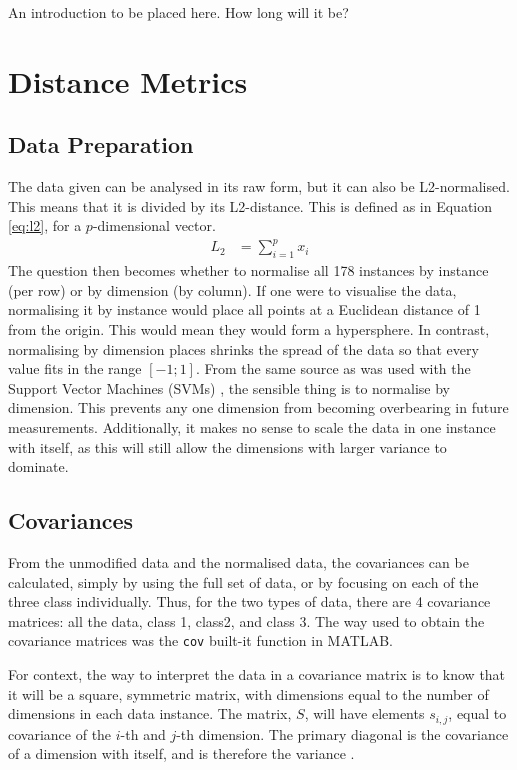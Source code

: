 \documentclass[a4paper, 10pt, conference]{ieeeconf}
\begin{document}
An introduction to be placed here. How long will it be?

\section{Distance Metrics}
\subsection{Data Preparation}
The data given can be analysed in its raw form, but it can also be L2-normalised. This means that it is divided by its L2-distance. This is defined as in Equation \ref{eq:l2}, for a $p$-dimensional vector.
\begin{align}
  L_2 &= \sum_{i = 1}^{p} x_i \label{eq:l2}
\end{align}
The question then becomes whether to normalise all 178 instances by instance (per row) or by dimension (by column). If one were to visualise the data, normalising it by instance would place all points at a Euclidean distance of 1 from the origin. This would mean they would form a hypersphere. In contrast, normalising by dimension places shrinks the spread of the data so that every value fits in the range $[-1; 1]$. From the same source as was used with the Support Vector Machines (SVMs) \cite{scale}, the sensible thing is to normalise by dimension. This prevents any one dimension from becoming overbearing in future measurements. Additionally, it makes no sense to scale the data in one instance with itself, as this will still allow the dimensions with larger variance to dominate.

\subsection{Covariances}
From the unmodified data and the normalised data, the covariances can be calculated, simply by using the full set of data, or by focusing on each of the three class individually. Thus, for the two types of data, there are 4 covariance matrices: all the data, class 1, class2, and class 3. The way used to obtain the covariance matrices was the \texttt{cov} built-it function in MATLAB.

For context, the way to interpret the data in a covariance matrix is to know that it will be a square, symmetric matrix, with dimensions equal to the number of dimensions in each data instance. The matrix, $S$, will have elements $s_{i, j}$, equal to covariance of the $i$-th and $j$-th dimension. The primary diagonal is the covariance of a dimension with itself, and is therefore the variance \cite{cov}.
\end{document}
